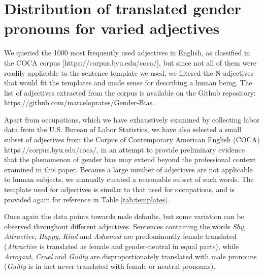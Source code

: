 \documentclass[twoside,11pt]{article}
\begin{document}
\section{Distribution of translated gender pronouns for varied adjectives}

We queried the 1000 most frequently used adjectives in English, as classified in the COCA corpus [https://corpus.byu.edu/coca/], but since not all of them were readily applicable to the sentence template we used, we filtered the N adjectives that would fit the templates and made sense for describing a human being. The list of adjectives extracted from the corpus is available on the Github repository: https://github.com/marceloprates/Gender-Bias.

Apart from occupations, which we have exhaustively examined by collecting labor data from the U.S. Bureau of Labor Statistics, we have also selected a small subset of adjectives from the Corpus of Contemporary American English (COCA) https://corpus.byu.edu/coca/, in an attempt to provide preliminary evidence that the phenomenon of gender bias may extend beyond the professional context examined in this paper. Because a large number of adjectives are not applicable to human subjects, we manually curated a reasonable subset of such words. The template used for adjectives is similar to that used for occupations, and is provided again for reference in Table \ref{tab:templates}.

Once again the data points towards male defaults, but some variation can be observed throughout different adjectives. Sentences containing the words \emph{Shy}, \emph{Attractive}, \emph{Happy}, \emph{Kind} and \emph{Ashamed} are predominantly female translated (\emph{Attractive} is translated as female and gender-neutral in equal parts), while \emph{Arrogant}, \emph{Cruel} and \emph{Guilty} are disproportionately translated with male pronouns (\emph{Guilty} is in fact never translated with female or neutral pronouns).
\end{document}
